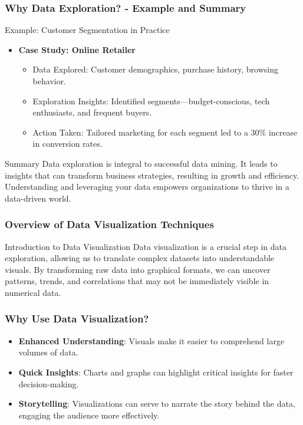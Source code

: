 \documentclass[aspectratio=169]{beamer}
\begin{document}
\begin{frame}[fragile]
    \frametitle{Why Data Exploration? - Example and Summary}
    \begin{block}{Example: Customer Segmentation in Practice}
        \begin{itemize}
            \item \textbf{Case Study: Online Retailer}
            \begin{itemize}
                \item Data Explored: Customer demographics, purchase history, browsing behavior.
                \item Exploration Insights: Identified segments—budget-conscious, tech enthusiasts, and frequent buyers.
                \item Action Taken: Tailored marketing for each segment led to a 30\% increase in conversion rates.
            \end{itemize}
        \end{itemize}
    \end{block}

    \begin{block}{Summary}
        Data exploration is integral to successful data mining. It leads to insights that can transform business strategies, resulting in growth and efficiency. Understanding and leveraging your data empowers organizations to thrive in a data-driven world.
    \end{block}
\end{frame}

\begin{frame}[fragile]
    \frametitle{Overview of Data Visualization Techniques}
    \begin{block}{Introduction to Data Visualization}
        Data visualization is a crucial step in data exploration, allowing us to translate complex datasets into understandable visuals. By transforming raw data into graphical formats, we can uncover patterns, trends, and correlations that may not be immediately visible in numerical data.
    \end{block}
\end{frame}

\begin{frame}[fragile]
    \frametitle{Why Use Data Visualization?}
    \begin{itemize}
        \item \textbf{Enhanced Understanding}: Visuals make it easier to comprehend large volumes of data.
        \item \textbf{Quick Insights}: Charts and graphs can highlight critical insights for faster decision-making.
        \item \textbf{Storytelling}: Visualizations can serve to narrate the story behind the data, engaging the audience more effectively.
    \end{itemize}
\end{frame}
\end{document}
